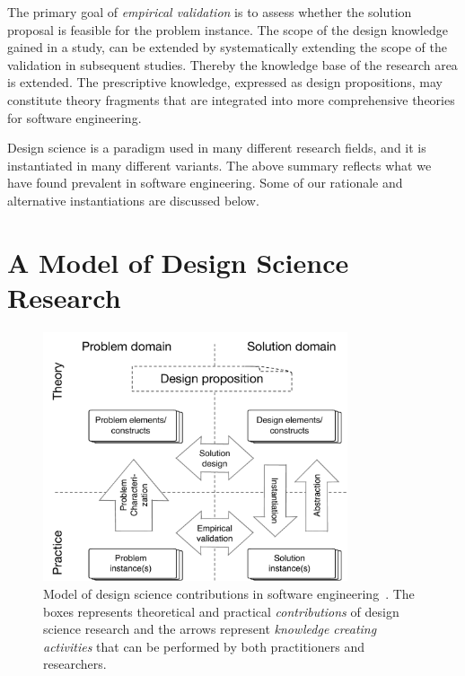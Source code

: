\documentclass[graybox]{svmult}
\begin{document}
 The primary goal of \emph{empirical validation} is to assess whether the solution proposal is feasible for the problem instance. The scope of the design knowledge gained in a study, can be extended by systematically extending the scope of the validation in subsequent studies. Thereby the knowledge base of the research area is extended. The prescriptive knowledge, expressed as design propositions,  may constitute theory fragments that are integrated into more comprehensive theories for software engineering. 


Design science is a paradigm used in many different research fields, and it is instantiated in many different variants.  The above summary reflects what we have found prevalent in software engineering. Some of our rationale and alternative instantiations are discussed below.



\section{A Model of Design Science Research}
\label{sec:DesignScienceResearch}


\begin{figure}[t]
\centering
 \includegraphics[width=0.8\textwidth]{Figures/DS_model.pdf}
\caption{Model of design science contributions in software engineering~\cite{Engstrom19arxiv}. The boxes represents theoretical and practical \emph{contributions} of design science research and the arrows represent \emph{knowledge creating activities} that can be performed by both practitioners and researchers.}
\label{fig:DS_model}       %
\end{figure}
\end{document}
